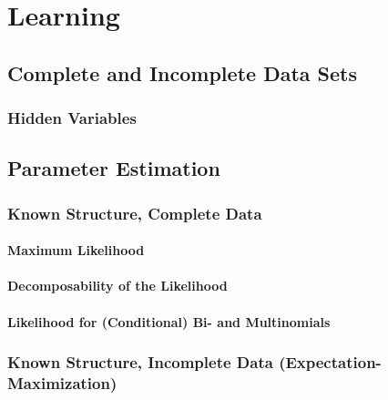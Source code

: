 \chapter{Learning} %

	\section{Complete and Incomplete Data Sets} %

		\subsection{Hidden Variables} %

	\section{Parameter Estimation} %

		\subsection{Known Structure, Complete Data} %

			\subsubsection{Maximum Likelihood} %

			\subsubsection{Decomposability of the Likelihood} %

			\subsubsection{Likelihood for (Conditional) Bi- and Multinomials} %

		\subsection{Known Structure, Incomplete Data (Expectation-Maximization)} %

